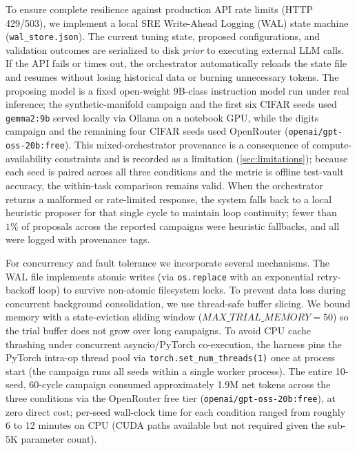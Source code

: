 \documentclass[conference]{IEEEtran}
\begin{document}
To ensure complete resilience against production API rate limits (HTTP 429/503), we implement a local SRE Write-Ahead Logging (WAL) state machine (\texttt{wal\_store.json}). The current tuning state, proposed configurations, and validation outcomes are serialized to disk \emph{prior} to executing external LLM calls. If the API fails or times out, the orchestrator automatically reloads the state file and resumes without losing historical data or burning unnecessary tokens. The proposing model is a fixed open-weight 9B-class instruction model run under real inference; the synthetic-manifold campaign and the first six CIFAR seeds used \texttt{gemma2:9b} served locally via Ollama on a notebook GPU, while the digits campaign and the remaining four CIFAR seeds used OpenRouter (\texttt{openai/gpt-oss-20b:free}). This mixed-orchestrator provenance is a consequence of compute-availability constraints and is recorded as a limitation (\cref{sec:limitations}); because each seed is paired across all three conditions and the metric is offline test-vault accuracy, the within-task comparison remains valid. When the orchestrator returns a malformed or rate-limited response, the system falls back to a local heuristic proposer for that single cycle to maintain loop continuity; fewer than $1\%$ of proposals across the reported campaigns were heuristic fallbacks, and all were logged with provenance tags.

For concurrency and fault tolerance we incorporate several mechanisms. The WAL file implements atomic writes (via \texttt{os.replace} with an exponential retry-backoff loop) to survive non-atomic filesystem locks. To prevent data loss during concurrent background consolidation, we use thread-safe buffer slicing. We bound memory with a state-eviction sliding window ($MAX\_TRIAL\_MEMORY = 50$) so the trial buffer does not grow over long campaigns. To avoid CPU cache thrashing under concurrent asyncio/PyTorch co-execution, the harness pins the PyTorch intra-op thread pool via \texttt{torch.set\_num\_threads(1)} once at process start (the campaign runs all seeds within a single worker process). The entire 10-seed, 60-cycle campaign consumed approximately 1.9M net tokens across the three conditions via the OpenRouter free tier (\texttt{openai/gpt-oss-20b:free}), at zero direct cost; per-seed wall-clock time for each condition ranged from roughly 6 to 12 minutes on CPU (CUDA paths available but not required given the sub-5K parameter count).

\end{document}
